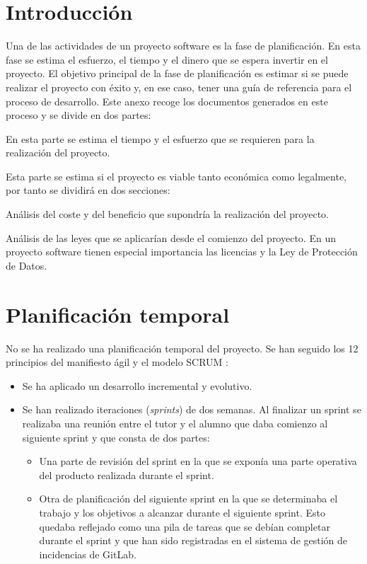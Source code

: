 \label{anex:A}

\section{Introducción}

Una de las actividades de un proyecto software es la fase de planificación. En esta fase se estima el esfuerzo, el tiempo y el dinero que se espera invertir en el proyecto. El objetivo principal de la fase de planificación es estimar si se puede realizar el proyecto con éxito y, en ese caso, tener una guía de referencia para el proceso de desarrollo. Este anexo recoge los documentos generados en este proceso y se divide en dos partes:
\begin{description}
	\tightlist
	\item[Planificación temporal.] En esta parte se estima el tiempo y el esfuerzo que se requieren para la realización del proyecto.
	\item[Estudio de la viabilidad.] Esta parte se estima si el proyecto es viable tanto económica como legalmente, por tanto se dividirá en dos secciones:
	\begin{description}
		\tightlist
		\item[Viabilidad económica.] Análisis del coste y del beneficio que supondría la realización del proyecto.
		\item[Viabilidad legal.] Análisis de las leyes que se aplicarían desde el comienzo del proyecto. En un proyecto software tienen especial importancia las licencias y la Ley de Protección de Datos.
	\end{description}
\end{description}

\section{Planificación temporal}
No se ha realizado una planificación temporal del proyecto. Se han seguido los 12 principios del manifiesto ágil y el modelo SCRUM \cite{noauthor_scrum_2019}:
\begin{itemize}
	\tightlist
	\item Se ha aplicado un desarrollo incremental y evolutivo.
	\item Se han realizado iteraciones (\textit{sprints}) de dos semanas. Al finalizar un sprint se realizaba una reunión entre el tutor y el alumno que daba comienzo al siguiente sprint y que consta de dos partes:
	\begin{itemize}
		\item Una parte de revisión del sprint en la que se exponía una parte operativa del producto realizada durante el sprint.
		\item Otra de planificación del siguiente sprint en la que se determinaba el trabajo y los objetivos a alcanzar durante el siguiente sprint. Esto quedaba reflejado como una pila de tareas que se debían completar durante el sprint y que han sido registradas en el sistema de gestión de incidencias de GitLab.
	\end{itemize}
\end{itemize}
